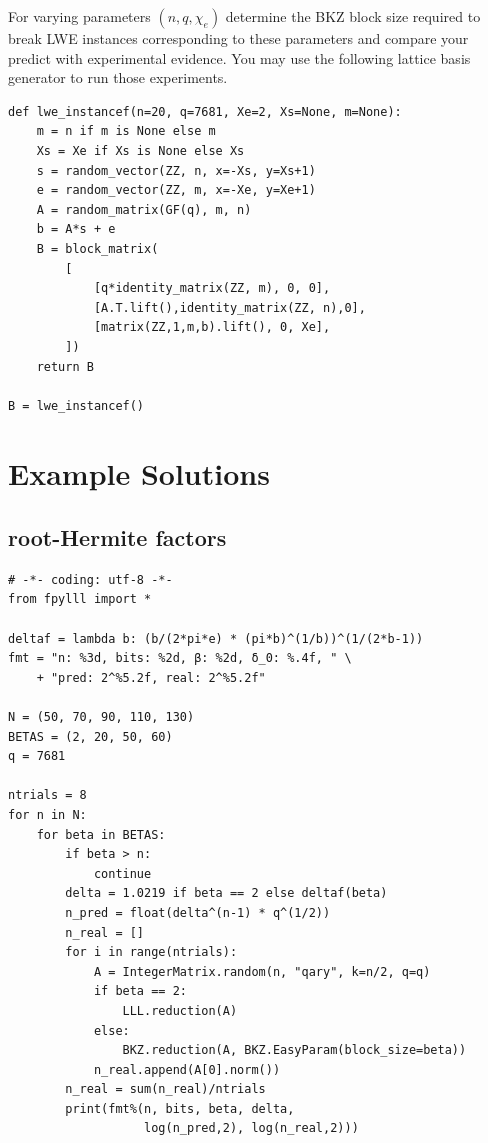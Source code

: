 \documentclass[10pt,a4paper,nobib]{tufte-handout}
\begin{document}
For varying parameters \((n,q,\chi_{e})\) determine the BKZ block size required to break LWE instances corresponding to these parameters and compare your predict with experimental evidence. You may use the following lattice basis generator to run those experiments.

\lstset{language=Python,label= ,caption= ,captionpos=b,numbers=none}
\begin{lstlisting}
def lwe_instancef(n=20, q=7681, Xe=2, Xs=None, m=None):
    m = n if m is None else m
    Xs = Xe if Xs is None else Xs
    s = random_vector(ZZ, n, x=-Xs, y=Xs+1)
    e = random_vector(ZZ, m, x=-Xe, y=Xe+1)
    A = random_matrix(GF(q), m, n)
    b = A*s + e
    B = block_matrix(
        [
            [q*identity_matrix(ZZ, m), 0, 0],
            [A.T.lift(),identity_matrix(ZZ, n),0],
            [matrix(ZZ,1,m,b).lift(), 0, Xe],
        ])
    return B

B = lwe_instancef()
\end{lstlisting}


\appendix
\clearpage

\section{Example Solutions}
\label{sec:org98f96ec}
\subsection{root-Hermite factors}
\label{sec:orgd7cdc74}

\lstset{language=Python,label= ,caption= ,captionpos=b,numbers=none}
\begin{lstlisting}
# -*- coding: utf-8 -*-
from fpylll import *

deltaf = lambda b: (b/(2*pi*e) * (pi*b)^(1/b))^(1/(2*b-1))
fmt = "n: %3d, bits: %2d, β: %2d, δ_0: %.4f, " \
    + "pred: 2^%5.2f, real: 2^%5.2f"

N = (50, 70, 90, 110, 130)
BETAS = (2, 20, 50, 60)
q = 7681

ntrials = 8
for n in N:
    for beta in BETAS:
        if beta > n:
            continue
        delta = 1.0219 if beta == 2 else deltaf(beta)
        n_pred = float(delta^(n-1) * q^(1/2))
        n_real = []
        for i in range(ntrials):
            A = IntegerMatrix.random(n, "qary", k=n/2, q=q)
            if beta == 2:
                LLL.reduction(A)
            else:
                BKZ.reduction(A, BKZ.EasyParam(block_size=beta))
            n_real.append(A[0].norm())
        n_real = sum(n_real)/ntrials
        print(fmt%(n, bits, beta, delta,
                   log(n_pred,2), log(n_real,2)))
\end{lstlisting}
\end{document}
